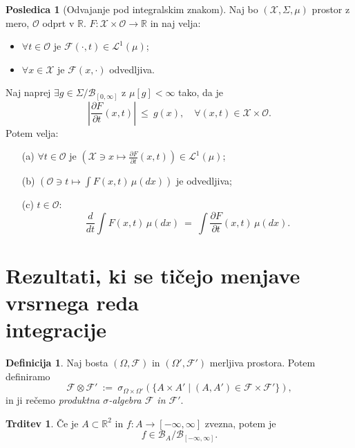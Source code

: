 \documentclass[11pt]{article}
\newcommand{\R}{\mathbb{R}}
\newcommand{\B}{\mathcal{B}}
\newcommand{\F}{\mathcal{F}}
\newcommand{\X}{\mathcal{X}}
\renewcommand{\O}{\mathcal{O}}
\renewcommand{\L}{\mathcal{L}}
\newcommand{\set}[1]{\{#1\}}
\newcommand{\oklepaj}[1]{\left(#1\right)}
\newcommand{\1}{\mathbbm{1}}
\newcommand{\rr}{[-\infty,\infty]}
\theoremstyle{definition}
\newtheorem{definicija}{Definicija}[section]
\theoremstyle{definition}
\newtheorem{trditev}{Trditev}[section]
\theoremstyle{definition}
\theoremstyle{definition}
\newtheorem*{posledica}{Posledica}
\begin{document}
\begin{posledica}[Odvajanje pod integralskim znakom]

Naj bo $(\X, \Sigma, \mu)$ prostor z mero, $\O$ odprt v $\R$. $F: \X \times \O \rightarrow \R$ in naj velja:
\begin{itemize}
	\item $\forall t \in \O$ je $\F(\cdot,t) \in \L^1(\mu)$;
	\item $\forall x \in \X$ je $\F(x,\cdot)$ odvedljiva.
\end{itemize}
Naj naprej $\exists g \in \Sigma/\B_{[0,\infty]}$ z $\mu[g]<\infty$ tako, da je
$$\left|\frac{\partial F}{\partial t}(x,t)\right| ~\leq~ g(x), \quad \forall (x,t) \in \X \times \O.$$
Potem velja:
\begin{enumerate}
	\item[(a)] $\forall t \in \O$ je $\oklepaj{\X \ni x \mapsto \frac{\partial F}{\partial t}(x,t)} \in \L^1(\mu)$;
	\item[(b)] $\oklepaj{\O \ni t \mapsto \int F(x,t) \,\mu(dx)}$ je odvedljiva;
	\item[(c)] $t \in \O$:
	$$\frac{d}{dt} \int F(x,t) \,\mu(dx) ~=~ \int \frac{\partial F}{\partial t}(x,t)\,\mu(dx).$$
\end{enumerate}

\end{posledica}
\vspace{0.5cm}


\section{Rezultati, ki se tičejo menjave vrsrnega reda \\integracije}
\vspace{0.5cm}

\begin{definicija}

Naj bosta $(\Omega, \F)$ in $(\Omega', \F')$ merljiva prostora. Potem definiramo
$$\F \otimes \F' ~:=~ \sigma_{\Omega\times\Omega'} \oklepaj{\set{A \times A' \mid (A,A') \in \F\times\F'}},$$
in ji rečemo \textit{produktna $\sigma$-algebra $\F$ in $\F'$}.

\end{definicija}
\vspace{0.5cm}

\begin{trditev}

Če je $A \subset \R^2$ in $f: A \rightarrow \rr$ zvezna, potem  je 
$$f \in \B_A/\B_{\rr}.$$

\end{trditev}
\vspace{0.5cm}
\end{document}
